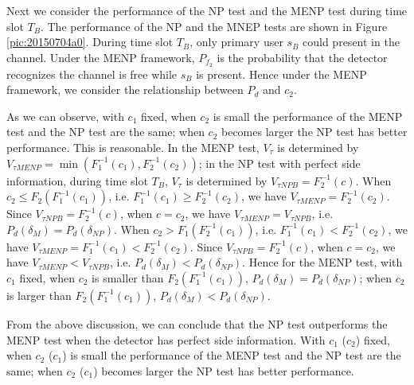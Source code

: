 Next we consider the performance of the NP test and the MENP test during time slot $T_B$.
The performance of the NP and the MNEP tests are shown in Figure \ref{pic:20150704a0}. During time slot $T_B$, only primary user $s_B$ could present in the channel. Under the MENP framework, $P_{f_2}$ is the probability that the detector recognizes the channel is free while $s_B$ is present. Hence under the MENP framework, we consider the relationship between $P_d$ and $c_2$.

As we can observe, with $c_1$  fixed, when $c_2$ is small the performance of the MENP test and the NP test are the same; when $c_2$ becomes larger the NP test has better performance. This is reasonable. In the MENP test, $V_\tau$ is determined by $V_{\tau MENP}= \min (F_1^{-1}(c_1), F_2^{-1}(c_2))$; in the NP test with perfect side information, during time slot $T_B$, $V_\tau$ is determined by $V_{\tau NP B} = F_2^{-1}(c)$. When $c_2 \leq F_2(F_1^{-1}(c_1))$, i.e. $F_1^{-1}(c_1) \geq  F_2^{-1}(c_2)$, we have  $V_{\tau MENP} = F_2^{-1}(c_2)$. Since $V_{\tau NP B} = F_2^{-1}(c)$, when $c = c_2$, we have $V_{\tau MENP} = V_{\tau NP B}$, i.e. $P_d(\delta_M) = P_d(\delta_{NP})$.    
When $c_2 > F_1(F_2^{-1}(c_1))$, i.e. $F_1^{-1}(c_1) < F_2^{-1}(c_2)$, we have  $V_{\tau MENP} = F_1^{-1}(c_1) < F_2^{-1}(c_2)$. Since $V_{\tau NP B} = F_2^{-1}(c)$, when $c = c_2$, we have  $V_{\tau MENP} < V_{\tau NP B}$, i.e.  $P_d(\delta_M) < P_d(\delta_{NP})$.
Hence for the MENP test, with $c_1$ fixed, when $c_2$ is smaller than $ F_2( F_1^{-1}(c_1)) $, $P_d(\delta_M) = P_d(\delta_{NP})$; when $c_2$ is larger than $ F_2( F_1^{-1}(c_1)) $, $P_d(\delta_M) < P_d(\delta_{NP})$. 

From the above discussion, we can conclude that the NP test outperforms the MENP test when the detector has perfect side information. With $c_1$ ($c_2$) fixed, when $c_2$ ($c_1$) is small the performance of the  MENP test and the NP test are the same; when $c_2$ ($c_1$) becomes larger the NP test has better performance.  
